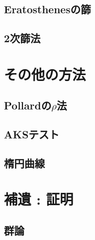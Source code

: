 \subsection{Eratosthenesの篩}

\subsection{2次篩法}


\section{その他の方法}
\subsection{Pollardの$\rho$法}

\subsection{AKSテスト}

\subsection{楕円曲線}


\section{補遺 : 証明}
\subsection{群論}


\newpage
\printindex



